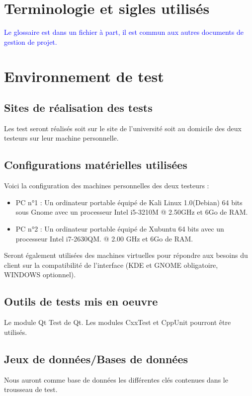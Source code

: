 \documentclass{../res/univ-projet}
\begin{document}
\section{Terminologie et sigles utilisés}
\textcolor{blue}{
  Le glossaire est dans un fichier à part, il est commun aux autres documents de gestion de projet.
}

\section{Environnement de test}
\subsection{Sites de réalisation des tests}
Les test seront réalisés soit sur le site de l'université soit au domicile des deux testeurs sur leur machine personnelle.



\subsection{Configurations matérielles utilisées}
Voici la configuration des machines personnelles des deux testeurs :
\begin{itemize}
 \item PC n°1 : Un ordinateur portable équipé de Kali Linux 1.0(Debian) 64 bits sous Gnome avec un processeur Intel i5-3210M @ 2.50GHz et 6Go de RAM.
 \item PC n°2 : Un ordinateur portable équipé de Xubuntu 64 bits avec un processeur Intel i7-2630QM.
 @ 2.00 GHz et 6Go de RAM.
\end{itemize}
Seront également utilisées des machines virtuelles pour répondre aux besoins du client sur la compatibilité de l'interface (KDE et GNOME obligatoire,
WINDOWS optionnel).

\subsection{Outils de tests mis en oeuvre}
Le module Qt Test de Qt.
Les modules CxxTest et CppUnit pourront être utilisés.

\subsection{Jeux de données/Bases de données}
Nous auront comme base de données les différentes clés contenues dans le trousseau de test.
\end{document}
